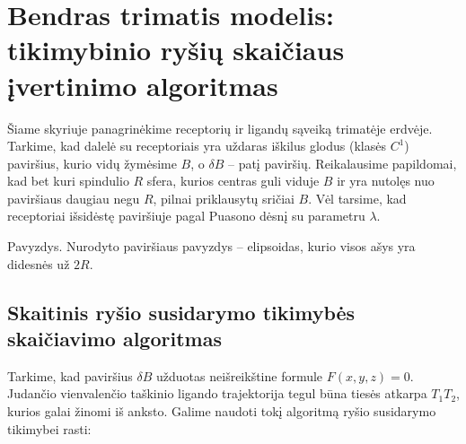 \documentclass[10pt]{article}
\begin{document}
  


\section{Bendras trimatis modelis: tikimybinio ryšių skaičiaus įvertinimo algoritmas}

Šiame skyriuje panagrinėkime receptorių ir ligandų sąveiką trimatėje erdvėje. Tarkime, kad dalelė su receptoriais yra uždaras iškilus  glodus (klasės $ C^1 $) paviršius, kurio vidų žymėsime $ B $, o $ \delta B  $ -- patį paviršių. Reikalausime papildomai, kad bet kuri  spindulio $R$ sfera, kurios centras guli viduje $ B $ ir yra nutolęs nuo  paviršiaus daugiau negu $ R $, pilnai priklausytų sričiai $ B $.  Vėl tarsime, kad receptoriai išsidėstę paviršiuje  pagal Puasono dėsnį su parametru $ \lambda $.

Pavyzdys. Nurodyto paviršiaus pavyzdys -- elipsoidas, kurio visos ašys yra didesnės už $ 2R $.


 
\subsection{Skaitinis ryšio susidarymo tikimybės skaičiavimo algoritmas}
Tarkime, kad paviršius $ \delta B $ užduotas neišreikštine formule $ F(x,y,z) = 0 $. Judančio vienvalenčio taškinio ligando trajektorija tegul būna tiesės atkarpa $ T_{1}T_{2} $, kurios galai žinomi iš anksto. Galime naudoti tokį  algoritmą ryšio susidarymo tikimybei rasti:
\end{document}
